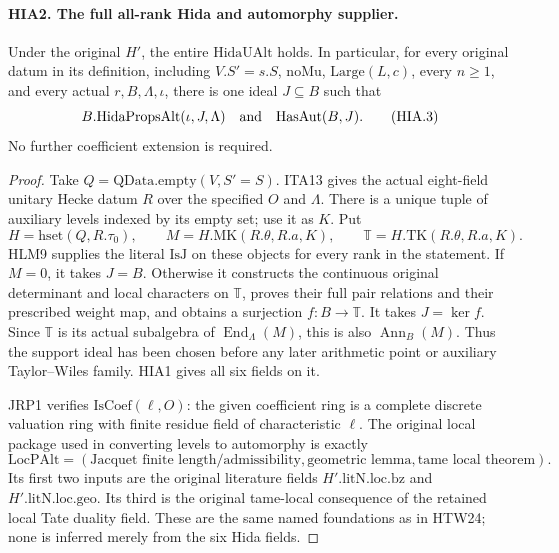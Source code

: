 \documentclass[11pt,a4paper]{article}
\numberwithin{equation}{section}
\theoremstyle{remark}\newtheorem{remark}[theorem]{Remark}
\begin{document}
\paragraph{HIA2. The full all-rank Hida and automorphy supplier.}
\label{claim:HIA2}
Under the original \(H'\), the entire \(\mathrm{HidaUAlt}\)
holds.  In particular, for every original datum in its definition,
including \(V.S'=s.S\), \(\mathrm{noMu}\),
\(\mathrm{Large}(L,c)\), every \(n\geq1\), and every
actual \(r,B,\Lambda,\iota\), there is one ideal \(J\subseteq B\)
such that
\[
 B.\mathrm{HidaPropsAlt}(\iota,J,\Lambda)
                   \quad\hbox{and}\quad \mathrm{HasAut}(B,J).
 \tag{HIA.3}
\]
No further coefficient extension is required.
\begin{proof}
Take \(Q=\mathrm{QData.empty}(V,S'=S)\).  ITA13 gives
the actual eight-field unitary Hecke datum \(R\) over the
specified \(O\) and \(\Lambda\).  There is a unique tuple
of auxiliary levels indexed by its empty set; use it as \(K\).
Put
\[
 H=\mathrm{hset}(Q,R.\tau_0),\qquad
 M=H.\mathrm{MK}(R.\theta,R.a,K),\qquad
 \mathbb T=H.\mathrm{TK}(R.\theta,R.a,K).
 \tag{HIA.4}
\]
HLM9 supplies the literal \(\mathrm{IsJ}\) on these objects
for every rank in the statement.  If \(M=0\), it takes
\(J=B\).  Otherwise it constructs the continuous original
determinant and local characters on \(\mathbb T\), proves
their full pair relations and their prescribed weight map,
and obtains a surjection \(f:B\to\mathbb T\).  It takes
\(J=\ker f\).  Since \(\mathbb T\) is its actual subalgebra
of \(\operatorname{End}_{\Lambda}(M)\), this is also
\(\operatorname{Ann}_B(M)\).  Thus the support ideal has been
chosen before any later arithmetic point or auxiliary
Taylor--Wiles family.  HIA1 gives all six fields on it.

JRP1 verifies \(\mathrm{IsCoef}(\ell,O)\): the given
coefficient ring is a complete discrete valuation ring with
finite residue field of characteristic \(\ell\).
The original local package used in converting levels to
automorphy is exactly
\[
 \mathrm{LocPAlt}=
 (\text{Jacquet finite length/admissibility},
   \text{geometric lemma},\text{tame local theorem}).
 \tag{HIA.5}
\]
Its first two inputs are the original literature fields
\(H'.\mathrm{litN.loc.bz}\) and
\(H'.\mathrm{litN.loc.geo}\).  Its third is the original
tame-local consequence of the retained local Tate duality
field.  These are the same named foundations as in HTW24;
none is inferred merely from the six Hida fields.


\end{proof}
\end{document}

